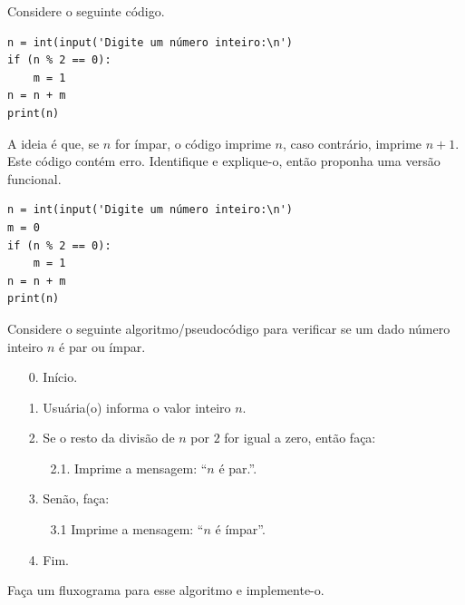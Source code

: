 \begin{exer}
  Considere o seguinte código.

\begin{lstlisting}
n = int(input('Digite um número inteiro:\n')
if (n % 2 == 0):
    m = 1
n = n + m
print(n)
\end{lstlisting}

A ideia é que, se $n$ for ímpar, o código imprime $n$, caso contrário, imprime $n+1$. Este código contém erro. Identifique e explique-o, então proponha uma versão funcional.
\end{exer}
\begin{resp}

\begin{lstlisting}
n = int(input('Digite um número inteiro:\n')
m = 0
if (n % 2 == 0):
    m = 1
n = n + m
print(n)
\end{lstlisting}

\end{resp}

\begin{exer}
  Considere o seguinte algoritmo/pseudocódigo para verificar se um dado número inteiro $n$ é par ou ímpar.

\ifisbook
\newpage
\fi
\begin{itemize}\setlength\itemsep{0em}
\item[0.] Início.
\item[1.] Usuária(o) informa o valor inteiro $n$.
\item[2.] Se o resto da divisão de $n$ por $2$ for igual a zero, então faça:
  \begin{itemize}\setlength\itemsep{0em}
  \item[2.1.] Imprime a mensagem: ``$n$ é par.''.
  \end{itemize}
\item[3.] Senão, faça:
  \begin{itemize}\setlength\itemsep{0em}
  \item[3.1] Imprime a mensagem: ``$n$ é ímpar''. 
  \end{itemize}
\item[4.] Fim.
\end{itemize}
Faça um fluxograma para esse algoritmo e implemente-o.
\end{exer}

